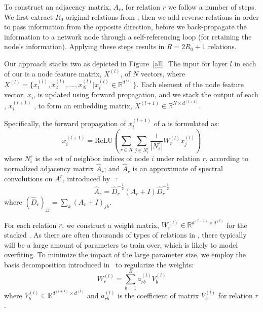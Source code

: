  To construct an adjacency matrix, $A_r$, for relation $r$ we follow a number of steps. We first extract $R_0$ original
 relations from \KGs, then we add reverse relations in order to pass information from the opposite direction, before we back-propagate the
 information to a network node through a self-referencing loop (for retaining the node's information). Applying these steps results in $R=2R_0+1$ relations. 	

 Our approach stacks two \RGCNs as depicted in Figure~\ref{all}.
 The input for layer $l$ in each of our \RGCNs is a node feature matrix, $X^{(l)}$, of $N$ vectors, where  $X^{(l)} =\{x^{(l)}_1,x^{(l)}_2,...,x^{(l)}_{N}
 |x^{(l)}_{i} \in \mathbb{R}^{d^{(l)}}\}$. Each element of the node feature vector, $x_i$, is updated using forward propagation, and we stack the output of each \RGCN, $x_i^{(l+1)}$
 , to form an embedding matrix, $X^{(l+1)} \in \mathbb{R}^{N \times d^{(l+1)}}$.

   Specifically, the forward propagation of $x_i^{(l+1)}$ of a \RGCN is formulated as:
	\begin{equation}
	x_i^{(l+1)}=\mathrm{ReLU} (\sum\limits_{r \in R}\sum\limits_{j \in N_i^r}\frac{1}{|N_i^r|}W_r^{(l)}x_j^{(l)})
	\end{equation}
%
%
where $N_i^r$ is the set of neighbor indices of node $i$ under relation $r$, according to normalized adjacency matrix $\hat A_r$; and $\hat
A_r$ is an approximate of spectral convolutions on $A^r$, introduced by ~\cite{Kipf2016Semi}:
	\begin{equation}
	\hat A_r=\hat D_r^{- \frac{1}{2}}(A_r+I)\hat D_r^{- \frac{1}{2}}
	\end{equation}
	where $(\hat D_r)_{jj}=\sum_k(A_r+I)_{jk}$.

	
	 For each relation $r$, we construct a weight matrix, $W_r^{(l)} \in \mathbb{R}^{d^{(l+1)}
\times d^{(l)}}$ for the stacked \RGCNs. As there are often thousands of types of relations in \KGs, there typically will be a large amount
of parameters to train over, which is likely to model overfiting. To minimize the impact of the large parameter size, we employ the basis
decomposition introduced in~\cite{Schlichtkrull2017Modeling} to regularize the weights:
	\begin{equation}
	W_r^{(l)}=\sum\limits_{b=1}^B a_{rb}^{(l)}V_b^{(l)}
	\end{equation}
	where $V_b^{(l)} \in \mathbb{R}^{d^{(l+1)} \times d^{(l)}}$ and $a_{rb}^{(l)}$ is the coefficient of matrix $V_b^{(l)}$ for relation $r$.

